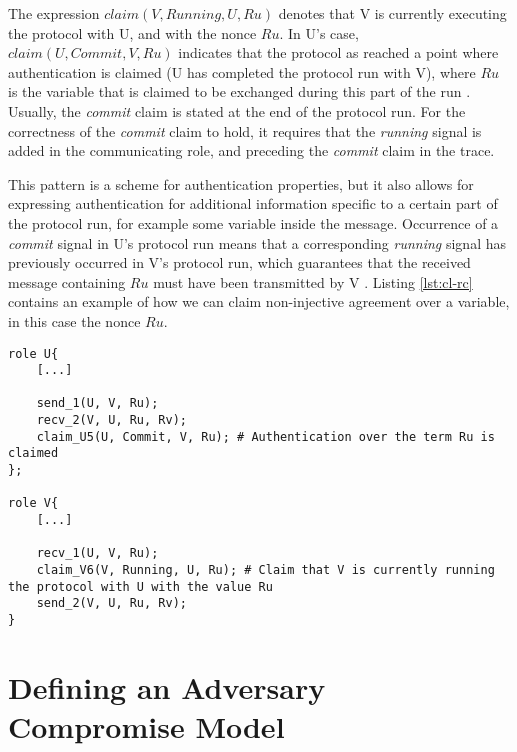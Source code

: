 The expression $claim(V, Running, U, Ru)$ denotes that V is currently executing the protocol with U, and with the nonce $Ru$. In U's case, $claim(U, Commit, V, Ru)$ indicates that the protocol as reached a point where authentication is claimed (U has completed the protocol run with V), where $Ru$ is the variable that is claimed to be exchanged during this part of the run \cite{ryan2001modelling}. Usually, the \emph{commit} claim is stated at the end of the protocol run. For the correctness of the \emph{commit} claim to hold, it requires that the \emph{running} signal is added in the communicating role, and preceding the \emph{commit} claim in the trace.

This pattern is a scheme for authentication properties, but it also allows for expressing authentication for additional information specific to a certain part of the protocol run, for example some variable inside the message. Occurrence of a \emph{commit} signal in U's protocol run means that a corresponding \emph{running} signal has previously occurred in V's protocol run, which guarantees that the received message containing $Ru$ must have been transmitted by V \cite{ryan2001modelling}. Listing \ref{lst:cl-rc} contains an example of how we can claim non-injective agreement over a variable, in this case the nonce $Ru$. 
\newline
\newpage
\begin{lstlisting}[caption={Example of running and commit claims in Scyther to provide authentication for a set of terms.}, label={lst:cl-rc}]
role U{
	[...]
	
	send_1(U, V, Ru);
	recv_2(V, U, Ru, Rv);
	claim_U5(U, Commit, V, Ru); # Authentication over the term Ru is claimed
};

role V{
	[...]
	
	recv_1(U, V, Ru);
	claim_V6(V, Running, U, Ru); # Claim that V is currently running the protocol with U with the value Ru
	send_2(V, U, Ru, Rv); 
}
\end{lstlisting}

\section{Defining an Adversary Compromise Model}
\label{sec:adversary}


